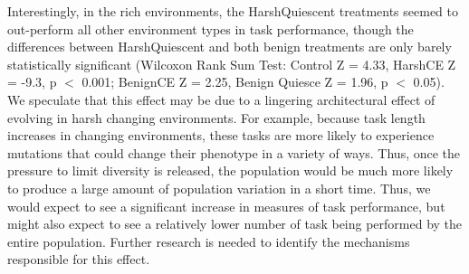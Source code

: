 \documentclass[PhD]{msu-thesis}
\begin{document}


Interestingly, in the rich environments, the HarshQuiescent treatments %
seemed to out-perform all other environment types in task performance, though the differences between HarshQuiescent and both benign treatments are only barely statistically significant (Wilcoxon Rank Sum Test: Control Z = 4.33, HarshCE Z = -9.3, p $<$ 0.001; BenignCE Z = 2.25, Benign Quiesce Z = 1.96, p $<$ 0.05). We speculate that this effect may be due to a lingering architectural effect of evolving in harsh changing environments. For example, because task length increases in changing environments, these tasks are more likely to experience mutations that could change their phenotype in a variety of ways. Thus, once the pressure to limit diversity is released, the population would be much more likely to produce a large amount of population variation in a short time. Thus, we would expect to see a significant increase in measures of task performance, but might also expect to see a relatively lower number of task being performed by the entire population.
Further research is needed to identify the mechanisms responsible for this effect.
\end{document}
